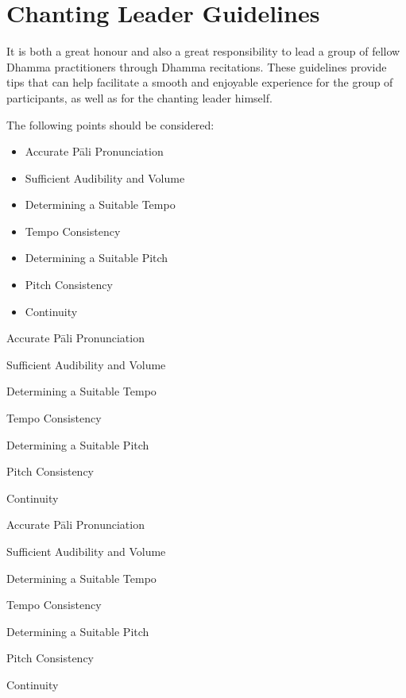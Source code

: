 \section{Chanting Leader Guidelines}

  It is both a great honour and also a great responsibility to lead a group of fellow Dhamma practitioners through Dhamma recitations. These guidelines provide tips that can help facilitate a smooth and enjoyable experience for the group of participants, as well as for the chanting leader himself.

The following points should be considered:

\ifafiveversion
\begin{itemize}
  \item Accurate Pāli Pronunciation
  \item Sufficient Audibility and Volume
  \item Determining a Suitable Tempo
  \item Tempo Consistency
  \item Determining a Suitable Pitch
  \item Pitch Consistency
  \item Continuity
\end{itemize}
\fi

\ifninebythirteenversion
\begin{packeditemize}
  \item Accurate Pāli Pronunciation
  \item Sufficient Audibility and Volume
  \item Determining a Suitable Tempo
  \item Tempo Consistency
  \item Determining a Suitable Pitch
  \item Pitch Consistency
  \item Continuity
\end{packeditemize}
\fi

\ifbfiveversion
\begin{packeditemize}
  \item Accurate Pāli Pronunciation
  \item Sufficient Audibility and Volume
  \item Determining a Suitable Tempo
  \item Tempo Consistency
  \item Determining a Suitable Pitch
  \item Pitch Consistency
  \item Continuity
\end{packeditemize}
\fi

